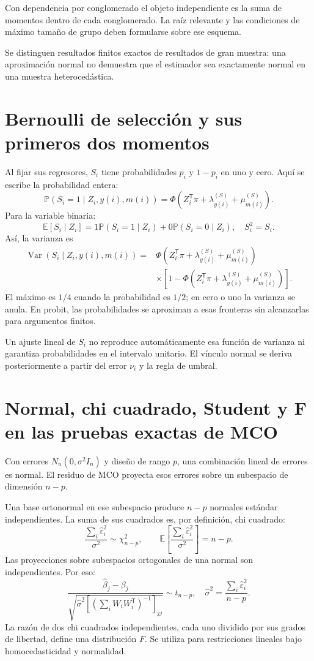 \documentclass[11pt,a4paper]{article}
\newcommand{\E}{\mathbb E}
\newcommand{\Prob}{\mathbb P}
\DeclareMathOperator{\Var}{Var}
\begin{document}
Con dependencia por conglomerado el objeto independiente es la suma de momentos dentro de cada conglomerado. La raíz relevante y las condiciones de máximo tamaño de grupo deben formularse sobre ese esquema.

Se distinguen resultados finitos exactos de resultados de gran muestra: una aproximación normal no demuestra que el estimador sea exactamente normal en una muestra heterocedástica.

\clearpage
\section{Bernoulli de selección y sus primeros dos momentos}

Al fijar sus regresores, $S_i$ tiene probabilidades $p_i$ y $1-p_i$ en uno y cero. Aquí se escribe la probabilidad entera:
\[
\Prob(S_i=1\mid Z_i,y(i),m(i))
=\Phi(Z_i^{\mathsf T}\pi+\lambda_{y(i)}^{(S)}+\mu_{m(i)}^{(S)}).
\]
Para la variable binaria:
\[
\E[S_i\mid Z_i]=1\Prob(S_i=1\mid Z_i)+0\Prob(S_i=0\mid Z_i),
\quad S_i^2=S_i.
\]
Así, la varianza es
\[
\begin{aligned}
\Var(S_i\mid Z_i,y(i),m(i))
={}&\Phi(Z_i^{\mathsf T}\pi+\lambda_{y(i)}^{(S)}+\mu_{m(i)}^{(S)})\\
&\times[1-\Phi(Z_i^{\mathsf T}\pi+\lambda_{y(i)}^{(S)}+\mu_{m(i)}^{(S)})].
\end{aligned}
\]
El máximo es $1/4$ cuando la probabilidad es $1/2$; en cero o uno la varianza se anula. En probit, las probabilidades se aproximan a esas fronteras sin alcanzarlas para argumentos finitos.

Un ajuste lineal de $S_i$ no reproduce automáticamente esa función de varianza ni garantiza probabilidades en el intervalo unitario. El vínculo normal se deriva posteriormente a partir del error $\nu_i$ y la regla de umbral.

\clearpage
\section{Normal, chi cuadrado, Student y F en las pruebas exactas de MCO}

Con errores $N_n(0,\sigma^2I_n)$ y diseño de rango $p$, una combinación lineal de errores es normal. El residuo de MCO proyecta esos errores sobre un subespacio de dimensión $n-p$.

Una base ortonormal en ese subespacio produce $n-p$ normales estándar independientes. La suma de sus cuadrados es, por definición, chi cuadrado:
\[
\frac{\sum_i\widehat\varepsilon_i^2}{\sigma^2}
\sim\chi^2_{n-p},\qquad
\E\left[\frac{\sum_i\widehat\varepsilon_i^2}{\sigma^2}\right]=n-p.
\]
Las proyecciones sobre subespacios ortogonales de una normal son independientes. Por eso:
\[
\frac{\widehat\beta_j-\beta_j}
{\sqrt{\widehat\sigma^2[(\sum_iW_iW_i^{\mathsf T})^{-1}]_{jj}}}
\sim t_{n-p},\quad
\widehat\sigma^2=\frac{\sum_i\widehat\varepsilon_i^2}{n-p}.
\]
La razón de dos chi cuadrados independientes, cada uno dividido por sus grados de libertad, define una distribución $F$. Se utiliza para restricciones lineales bajo homocedasticidad y normalidad.
\end{document}
